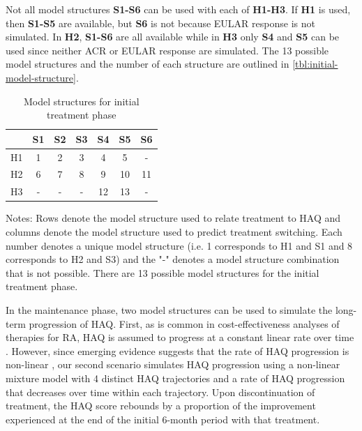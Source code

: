 \documentclass[11pt,final,fleqn]{article}\usepackage[]{graphicx}\usepackage[]{color}
\theoremstyle{plain}
\begin{document}
Not all model structures \textbf{S1-S6} can be used with each of \textbf{H1-H3}. If \textbf{H1} is used, then \textbf{S1-S5} are available, but \textbf{S6} is not because EULAR response is not simulated. In \textbf{H2}, \textbf{S1-S6} are all available while in \textbf{H3} only \textbf{S4} and \textbf{S5} can be used since neither ACR or EULAR response are simulated. The 13 possible model structures and the number of each structure are outlined in \autoref{tbl:initial-model-structure}.  

\begin{table}[!ht] 
\begin{center}
\begin{threeparttable}
\caption{Model structures for initial treatment phase} \label{tbl:initial-model-structure}
\begin{tabularx}{\textwidth}{@{\extracolsep{\fill}}lcccccc}
\hline
\multicolumn{1}{l}{} & \multicolumn{1}{c}{S1} & \multicolumn{1}{c}{S2} & \multicolumn{1}{c}{S3} & \multicolumn{1}{c}{S4} & \multicolumn{1}{c}{S5} & \multicolumn{1}{c}{S6} \\
\hline
H1 & 1 & 2 & 3 & 4 & 5 & - \\
H2 & 6 & 7 & 8 & 9 & 10 & 11 \\
H3 & - & - & - & 12 & 13 & -\\
\hline
\end{tabularx}
\scriptsize
Notes: Rows denote the model structure used to relate treatment to HAQ and columns denote the model structure used to predict treatment switching. Each number denotes a unique model structure (i.e. 1 corresponds to H1 and S1 and 8 corresponds to H2 and S3) and the "-" denotes a model structure combination that is not possible. There are 13 possible model structures for the initial treatment phase. 
\end{threeparttable}
\end{center}
\end{table}


In the maintenance phase, two model structures can be used to simulate the long-term progression of HAQ. First, as is common in cost-effectiveness analyses of therapies for RA, HAQ is assumed to progress at a constant linear rate over time \citep[see][]{tosh2011sheffield, wailoo2008biologic}. However, since emerging evidence suggests that the rate of HAQ progression is non-linear \citep{gibson2016haq}, our second scenario simulates HAQ progression using a non-linear mixture model \citep{norton2014health} with 4 distinct HAQ trajectories and a rate of HAQ progression that decreases over time within each trajectory. Upon discontinuation of treatment, the HAQ score rebounds by a proportion of the improvement experienced at the end of the initial 6-month period with that treatment.
\end{document}
